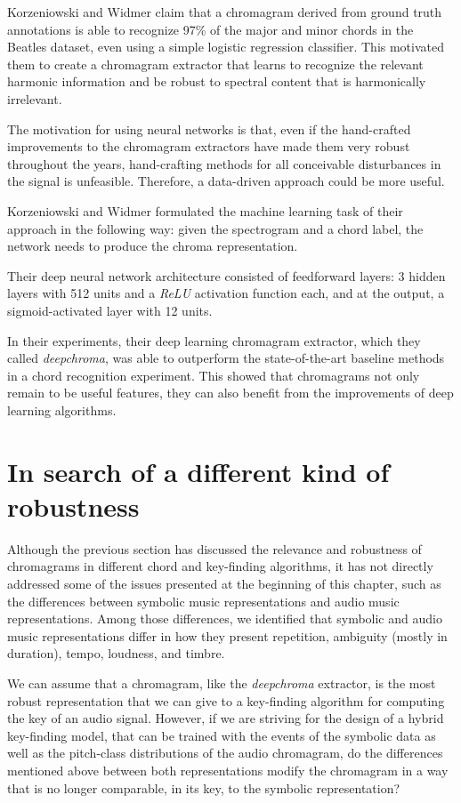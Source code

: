 Korzeniowski and Widmer claim that a chromagram derived from ground truth annotations is able to recognize 97\% of the major and minor chords in the Beatles dataset, even using a simple logistic regression classifier. This motivated them to create a chromagram extractor that learns to recognize the relevant harmonic information and be robust to spectral content that is harmonically irrelevant.

The motivation for using neural networks is that, even if the hand-crafted improvements to the chromagram extractors have made them very robust throughout the years, hand-crafting methods for all conceivable disturbances in the signal is unfeasible. Therefore, a data-driven approach could be more useful.

Korzeniowski and Widmer formulated the machine learning task of their approach in the following way: given the spectrogram and a chord label, the network needs to produce the chroma representation.

Their deep neural network architecture consisted of feedforward layers: 3 hidden layers with 512 units and a \emph{ReLU} activation function each, and at the output, a sigmoid-activated layer with 12 units.

In their experiments, their deep learning chromagram extractor, which they called \emph{deepchroma}, was able to outperform the state-of-the-art baseline methods in a chord recognition experiment. This showed that chromagrams not only remain to be useful features, they can also benefit from the improvements of deep learning algorithms. 

\section{In search of a different kind of robustness}

Although the previous section has discussed the relevance and robustness of chromagrams in different chord and key-finding algorithms, it has not directly addressed some of the issues presented at the beginning of this chapter, such as the differences between symbolic music representations and audio music representations. Among those differences, we identified that symbolic and audio music representations differ in how they present repetition, ambiguity (mostly in duration), tempo, loudness, and timbre.

We can assume that a chromagram, like the \emph{deepchroma} extractor, is the most robust representation that we can give to a key-finding algorithm for computing the key of an audio signal. However, if we are striving for the design of a hybrid key-finding model, that can be trained with the events of the symbolic data as well as the pitch-class distributions of the audio chromagram, do the differences mentioned above between both representations modify the chromagram in a way that is no longer comparable, in its key, to the symbolic representation?

